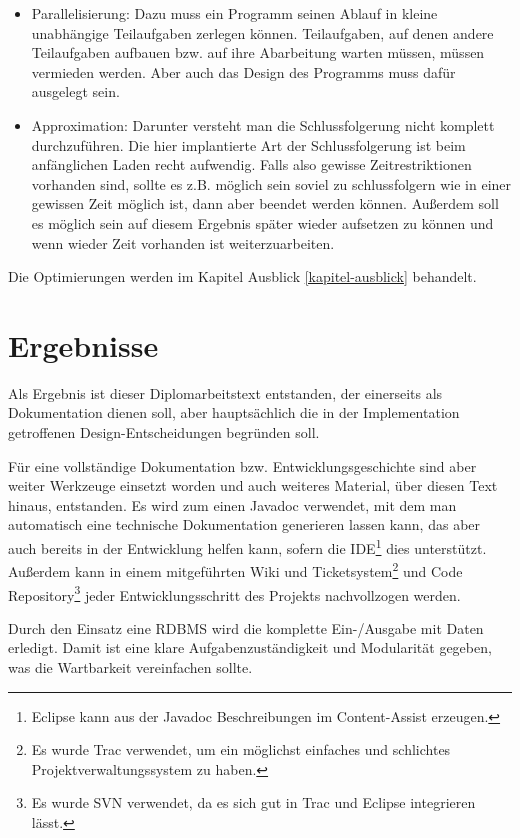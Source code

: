 \begin{itemize}
  \item Parallelisierung: Dazu muss ein Programm seinen Ablauf in kleine unabhängige Teilaufgaben zerlegen können. Teilaufgaben, auf denen andere Teilaufgaben aufbauen bzw. auf ihre Abarbeitung warten müssen, müssen vermieden werden. Aber auch das Design des Programms muss dafür ausgelegt sein.
  \item Approximation: Darunter versteht man die Schlussfolgerung nicht komplett durchzuführen. Die hier implantierte Art der Schlussfolgerung ist beim anfänglichen Laden recht aufwendig. Falls also gewisse Zeitrestriktionen vorhanden sind, sollte es z.B. möglich sein soviel zu schlussfolgern wie in einer gewissen Zeit möglich ist, dann aber beendet werden können. Außerdem soll es möglich sein auf diesem Ergebnis später wieder aufsetzen zu können und wenn wieder Zeit vorhanden ist weiterzuarbeiten.
\end{itemize}

Die Optimierungen werden im Kapitel Ausblick \ref{kapitel-ausblick} behandelt.

\section{Ergebnisse}
Als Ergebnis ist dieser Diplomarbeitstext entstanden, der einerseits als Dokumentation dienen soll, aber hauptsächlich die in der Implementation getroffenen Design-Entscheidungen begründen soll.

Für eine vollständige Dokumentation bzw. Entwicklungsgeschichte sind aber weiter Werkzeuge einsetzt worden und auch weiteres Material, über diesen Text hinaus, entstanden. Es wird zum einen Javadoc verwendet, mit dem man automatisch eine technische Dokumentation generieren lassen kann, das aber auch bereits in der Entwicklung helfen kann, sofern die IDE\footnote{Eclipse kann aus der Javadoc Beschreibungen im Content-Assist erzeugen.} dies unterstützt. Außerdem kann in einem mitgeführten Wiki und Ticketsystem\footnote{Es wurde Trac verwendet, um ein möglichst einfaches und schlichtes Projektverwaltungssystem zu haben.} und Code Repository\footnote{Es wurde SVN verwendet, da es sich gut in Trac und Eclipse integrieren lässt.} jeder Entwicklungsschritt des Projekts nachvollzogen werden.

Durch den Einsatz eine RDBMS wird die komplette Ein-/Ausgabe mit Daten erledigt. Damit ist eine klare Aufgabenzuständigkeit und Modularität gegeben, was die Wartbarkeit vereinfachen sollte. 

